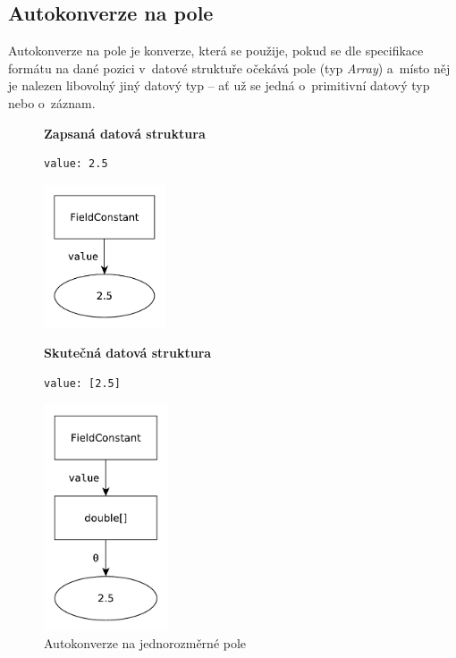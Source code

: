\documentclass[FM,bw,DP]{tulthesis}
\begin{document}
\subsection{Autokonverze na pole}
\label{sec:analyza-autokonverze-pole}

\lstset{style=short}

Autokonverze na pole je konverze, která se použije, pokud se dle specifikace formátu na dané pozici v~datové struktuře očekává pole (typ \textit{Array}) a~místo něj je nalezen libovolný jiný datový typ -- ať už se jedná o~primitivní datový typ nebo o~záznam.

\begin{figure}[ht]
\begin{minipage}[t]{0.45\linewidth}
\vspace{0pt}
\textbf{Zapsaná datová struktura}\\
\vspace{-5pt}
\begin{lstlisting}
value: 2.5
\end{lstlisting}
\vspace*{-20pt}
\begin{center}
\includegraphics[height=120pt]{../img/autoconversion_array_1_before.pdf}
\end{center}
\end{minipage}
\quad
\begin{minipage}[t]{0.45\linewidth}
\vspace{0pt}
\textbf{Skutečná datová struktura}\\
\vspace{-5pt}
\begin{lstlisting}
value: [2.5]
\end{lstlisting}
\vspace*{-20pt}
\begin{center}
\includegraphics[height=190pt]{../img/autoconversion_array_1_after.pdf}
\end{center}
\end{minipage}
\caption{Autokonverze na jednorozměrné pole}
\label{img:autoconversion_array_1}
\end{figure}	
\end{document}
